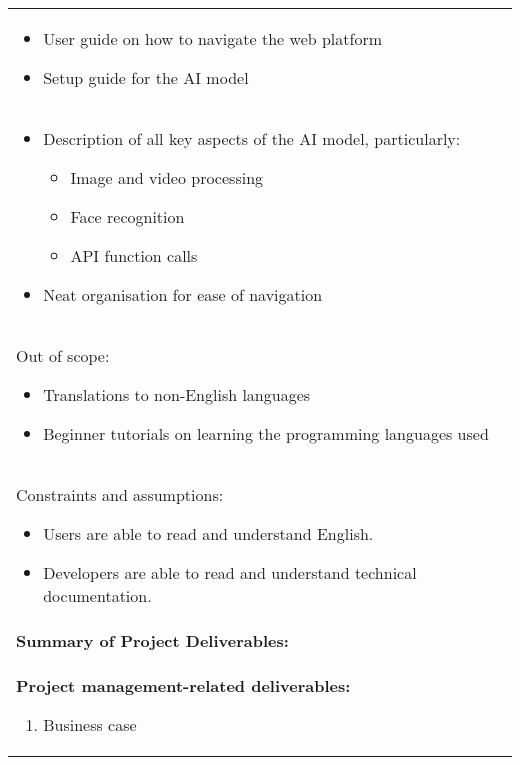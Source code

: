 \begin{longtable}{ | p{} l | }
{        \begin{itemize}
            \item User guide on how to navigate the web platform
            \item Setup guide for the AI model
        \end{itemize}
    } \\
    \multicolumn{2}{|p{\textwidth}|}{\hspace{0.6cm}
        \begin{itemize}
            \item Description of all key aspects of the AI model, particularly:
                \begin{itemize}
                    \item Image and video processing
                    \item Face recognition
                    \item API function calls
                \end{itemize}
            \item Neat organisation for ease of navigation
        \end{itemize}
    } \\
    \multicolumn{2}{|p{\textwidth}|}{\hspace{0.6cm}Out of scope:
        \begin{itemize}
            \item Translations to non-English languages
            \item Beginner tutorials on learning the programming languages used
        \end{itemize}
    } \\
    \multicolumn{2}{|p{\textwidth}|}{\hspace{0.6cm}Constraints and assumptions:
        \begin{itemize}
            \item Users are able to read and understand English.
            \item Developers are able to read and understand technical documentation.
        \end{itemize}
    } \\
    \hline
    \multicolumn{2}{|l|}{\textbf{Summary of Project Deliverables:}} \\
    \multicolumn{2}{|p{\textwidth}|}{\textbf{Project management-related deliverables:}
        \begin{enumerate}
            \item Business case

\end{enumerate}}
\end{longtable}
